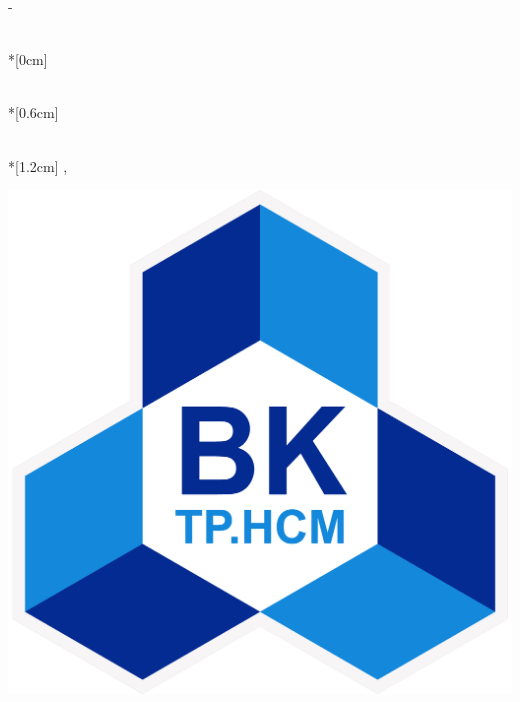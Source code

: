 \thispagestyle{empty}             %
\calccentering{\unitlength}
\begin{adjustwidth*}{\unitlength}{-\unitlength}
    \begin{adjustwidth}{-0.5cm}{-0.5cm}
        \sffamily
        \begin{flushright}
            \thesistype\\*[0cm]
            \thesistypeabbr \\
        \end{flushright}
        \vspace*{\fill}
        \noindent
        \university
        \HUGE \textbf{\thesistitle}\\*[0.6cm]
        \parbox[b]{0.5\linewidth}{
        \huge \thesisauthor\\*[1.2cm]
        \large\thesislocation{}, \the\year
        } 
        
        \hfill\includegraphics[scale=0.14]{graphics/bklogo.png}
    \end{adjustwidth}
\end{adjustwidth*}
\normalfont
\normalsize
